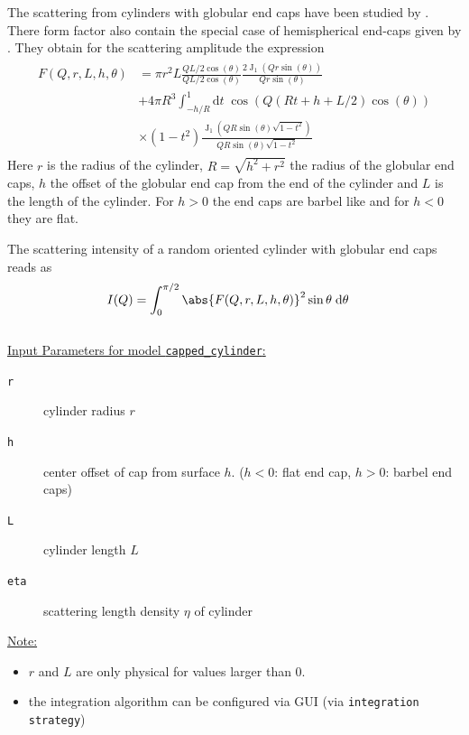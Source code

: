 The scattering from cylinders with globular end caps have been studied by \cite{Kaya:aj5008,Kaya:aj5016}.
There form factor also contain the special case of hemispherical end-caps given by \cite{Cusack1981}. They obtain for the scattering amplitude the expression
\begin{align}\label{eq:CappedCylinders}
\begin{split}
  F(Q,r,L,h,\theta) &= \pi r^2 L \frac{QL/2 \cos(\theta)}{QL/2 \cos(\theta)} \frac{2\operatorname{J}_1(Qr\sin(\theta))}{Qr\sin(\theta)} \\
  & + 4\pi R^3 \int_{-h/R}^1 \mathrm{d}t \; \cos\left(Q(Rt+h+L/2)\cos(\theta)\right)\\
  & \times (1-t^2) \frac{\operatorname{J}_1\left(QR\sin(\theta)\sqrt{1-t^2}\right)}{QR\sin(\theta)\sqrt{1-t^2}}
\end{split}
\end{align}
Here $r$ is the radius of the cylinder, $R=\sqrt{h^2+r^2}$ the radius of the globular end caps, $h$ the offset of the globular end cap from the end of the cylinder and $L$ is the length of the cylinder. For $h>0$ the end caps are barbel like and for $h<0$ they are flat.

The scattering intensity of a random oriented cylinder with globular end caps reads as
\begin{align}\label{eq:randomoriented_cappedcylinders}
  I(Q) &= \int_0^{\pi/2} \abs{F(Q,r,L,h,\theta)}^2 \sin\theta \; \mathrm{d}\theta
\end{align}
\hspace{1pt}\\
\uline{Input Parameters for model \texttt{capped\_cylinder}:}\\
\begin{description}
\item[\texttt{r}] cylinder radius $r$
\item[\texttt{h}] center offset of cap from surface $h$. ($h<0$: flat end cap, $h>0$: barbel end caps)
\item[\texttt{L}] cylinder length $L$
\item[\texttt{eta}] scattering length density $\eta$ of cylinder
\end{description}

\noindent\uline{Note:}
\begin{itemize}
\item $r$ and $L$ are only physical for values larger than 0.
\item the integration algorithm can be configured via GUI (via \texttt{integration strategy})
\end{itemize}

